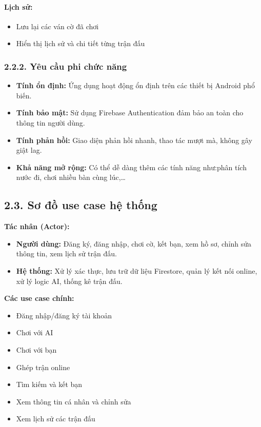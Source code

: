 \documentclass[a4paper,12pt]{article}
\begin{document}
\paragraph{Lịch sử:} %
\begin{itemize}[label=·]
    \item Lưu lại các ván cờ đã chơi
    \item Hiển thị lịch sử và chi tiết từng trận đấu
\end{itemize}

\subsubsection*{2.2.2. Yêu cầu phi chức năng} %

\justify
\begin{itemize}[label=·]
    \item \textbf{Tính ổn định:} Ứng dụng hoạt động ổn định trên các thiết bị Android phổ biến.
    \item \textbf{Tính bảo mật:} Sử dụng Firebase Authentication đảm bảo an toàn cho thông tin người dùng.
    \item \textbf{Tính phản hồi:} Giao diện phản hồi nhanh, thao tác mượt mà, không gây giật lag.
    \item \textbf{Khả năng mở rộng:} Có thể dễ dàng thêm các tính năng như:phân tích nước đi, chơi nhiều bàn cùng lúc,…
\end{itemize}

\subsection*{2.3. Sơ đồ use case hệ thống} %

\justify
\noindent \textbf{Tác nhân (Actor):}
\begin{itemize}[label=·]
    \item \textbf{Người dùng:} Đăng ký, đăng nhập, chơi cờ, kết bạn, xem hồ sơ, chỉnh sửa thông tin, xem lịch sử trận đấu.
    \item \textbf{Hệ thống:} Xử lý xác thực, lưu trữ dữ liệu Firestore, quản lý kết nối online, xử lý logic AI, thống kê trận đấu.
\end{itemize}

\noindent \textbf{Các use case chính:}
\begin{itemize}[label=·]
    \item Đăng nhập/đăng ký tài khoản
    \item Chơi với AI
    \item Chơi với bạn
    \item Ghép trận online
    \item Tìm kiếm và kết bạn
    \item Xem thông tin cá nhân và chỉnh sửa
    \item Xem lịch sử các trận đấu
\end{itemize}
\end{document}
